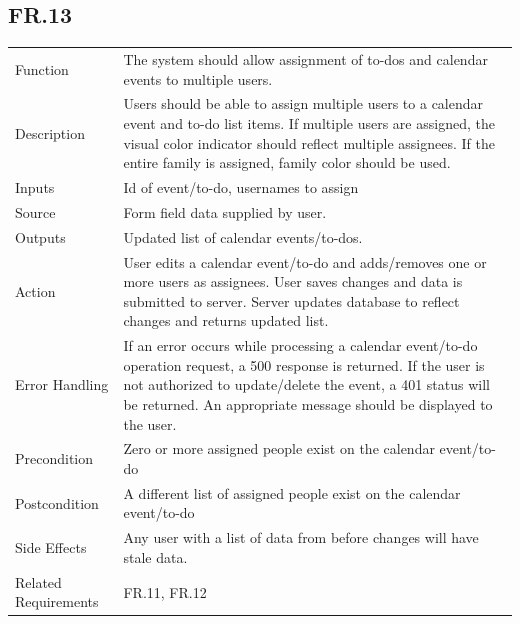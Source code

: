 \documentclass[12pt]{article}
\begin{document}
    \subsection*{FR.13}
    \begin{center}
        \begin{tabular}{| p{10em} p{26em} |}
        \hline
         Function & The system should allow assignment of to-dos and calendar events to multiple users.\\
         Description & Users should be able to assign multiple users to a calendar event and to-do list items. If multiple users are assigned, the visual color indicator should reflect multiple assignees. If the entire family is assigned, family color should be used.\\
         Inputs & Id of event/to-do, usernames to assign\\
         Source & Form field data supplied by user.\\
         Outputs & Updated list of calendar events/to-dos.\\
         Action & User edits a calendar event/to-do and adds/removes one or more users as assignees. User saves changes and data is submitted to server. Server updates database to reflect changes and returns updated list.\\
         Error Handling & If an error occurs while processing a calendar event/to-do operation request, a 500 response is returned. If the user is not authorized to update/delete the event, a 401 status will be returned. An appropriate message should be displayed to the user.\\
         Precondition & Zero or more assigned people exist on the calendar event/to-do\\
         Postcondition & A different list of assigned people exist on the calendar event/to-do\\
         Side Effects & Any user with a list of data from before changes will have stale data.\\
         Related Requirements & FR.11, FR.12\\
         \hline
        \end{tabular}
    \end{center}
\end{document}
